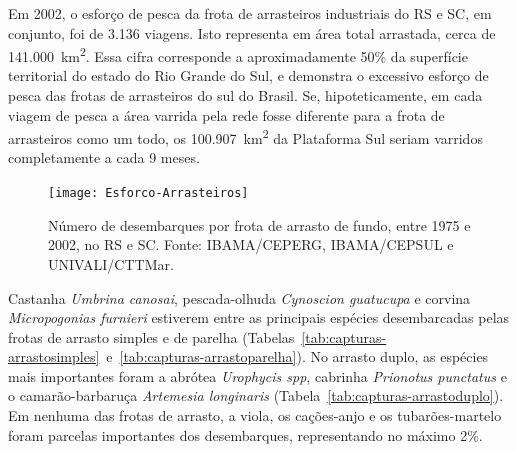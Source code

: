 \documentclass[a4paper,11pt,twoside,showtrims,onecolumn,openright,final]{memoir}
\begin{document}

Em 2002, o esforço de pesca da frota de arrasteiros industriais do RS 
e SC, em conjunto, foi de 3.136 viagens. Isto representa em área total 
arrastada, cerca de 141.000~km\textsuperscript{2}. Essa cifra corresponde a aproximadamente
50\% da superfície territorial do estado do Rio Grande do Sul, e demonstra o excessivo esforço de
pesca das frotas de arrasteiros do sul do Brasil. Se, hipoteticamente, em cada viagem
de pesca a área varrida pela rede fosse diferente para a frota de arrasteiros como um todo,
os 100.907~km\textsuperscript{2} da Plataforma Sul seriam varridos completamente 
a cada 9 meses.

%
%

\begin{figure}
\begin{center}
\texttt{[image: Esforco-Arrasteiros]}
\end{center}
\caption[Número de desembarques por frota de arrasto de fundo, entre 1975 e 2002, no RS e SC.]
        {Número de desembarques por frota de arrasto de fundo, entre 1975 e 2002, no RS e SC. 
	 Fonte: IBAMA/CEPERG, IBAMA/CEPSUL e UNIVALI/CTTMar.}
\label{fig:arrasteiros-esforco}
\end{figure}



Castanha \emph{Umbrina canosai}, pescada-olhuda \emph{Cynoscion guatucupa} 
e corvina \emph{Micropogonias furnieri} estiverem entre as principais espécies
desembarcadas pelas frotas de arrasto simples e de parelha 
(Tabelas~\ref{tab:capturas-arrastosimples}~e~\ref{tab:capturas-arrastoparelha}).
No arrasto duplo, as espécies mais importantes foram a abrótea \emph{Urophycis spp},
cabrinha \emph{Prionotus punctatus} e o camarão-barbaruça \emph{Artemesia longinaris}
(Tabela~\ref{tab:capturas-arrastoduplo}). Em nenhuma das frotas de arrasto, a viola,
os cações-anjo e os tubarões-martelo foram parcelas importantes dos desembarques,
representando no máximo 2\%.

\end{document}
